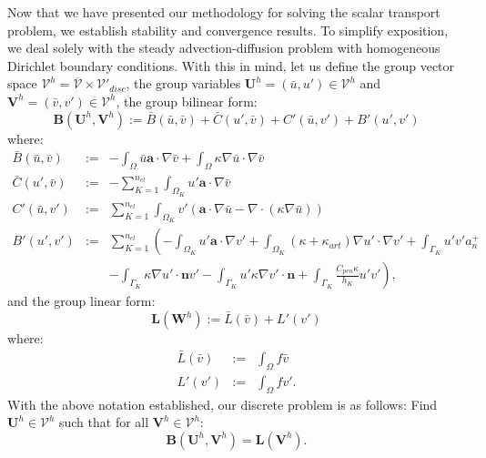 \documentclass[11pt]{article}
\begin{document}
\noindent Now that we have presented our methodology for solving the scalar transport problem, we establish stability and convergence results.  To simplify exposition, we deal solely with the steady advection-diffusion problem with homogeneous Dirichlet boundary conditions.  With this in mind, let us define the group vector space $\bm{\mathcal{V}}^h = \overline{\mathcal{V}} \times \mathcal{V}'_{disc}$, the group variables $\textbf{U}^h = \left( \bar{u}, u' \right) \in \bm{\mathcal{V}}^h$ and $\textbf{V}^h = \left( \bar{v}, v'\right) \in \bm{\mathcal{V}}^h$, the group bilinear form:
\begin{equation}
\mathbf{B}\left(\textbf{U}^h,\textbf{V}^h\right) := \bar{B}(\bar{u},\bar{v}) + \bar{C}(u',\bar{v}) + C'(\bar{u},v') + B'(u',v')
\end{equation}
where:
\begin{eqnarray}
\bar{B}(\bar{u},\bar{v}) & := & -\int_{\Omega} \bar{u} \bm{a} \cdot \nabla \bar{v} + \int_{\Omega} \kappa \nabla \bar{u} \cdot \nabla \bar{v} \nonumber \\
\bar{C}(u',\bar{v}) & := & -\sum_{K=1}^{n_{el}} \int_{\Omega_K} u' \bm{a} \cdot \nabla \bar{v} \nonumber \\
C'(\bar{u},v') & := & \sum_{K=1}^{n_{el}} \int_{\Omega_K} v' \left( \bm{a} \cdot \nabla \bar{u} - \nabla \cdot \left( \kappa \nabla \bar{u} \right) \right) \nonumber \\
B'(u',v') & := & \sum_{K=1}^{n_{el}} \left( -\int_{\Omega_K} u' \bm{a} \cdot \nabla v' + \int_{\Omega_K} \left( \kappa + \kappa_{art} \right) \nabla u' \cdot \nabla v' + \int_{\Gamma_K} u' v' a_n^+ \right. \nonumber \\
& & \left. - \int_{\Gamma_K} \kappa \nabla u' \cdot \bm{n} v' - \int_{\Gamma_K} u' \kappa \nabla v' \cdot \bm{n} + \int_{\Gamma_K} \frac{C_{pen} \kappa}{h_K} u' v' \right), \nonumber
\end{eqnarray}
and the group linear form:
\begin{equation}
\mathbf{L}\left(\textbf{W}^h\right) := \bar{L}(\bar{v}) + L'(v')
\end{equation}
where:
\begin{eqnarray}
\bar{L}(\bar{v}) & := & \int_{\Omega} f \bar{v} \nonumber \\
L'(v') & := & \int_{\Omega} f v' \nonumber.
\end{eqnarray}
With the above notation established, our discrete problem is as follows: Find $\textbf{U}^h \in \bm{\mathcal{V}}^h$ such that for all $\textbf{V}^h \in \bm{\mathcal{V}}^h$:
\begin{equation}
\mathbf{B}\left(\textbf{U}^h,\textbf{V}^h\right) = \mathbf{L}\left(\textbf{V}^h\right).
\end{equation}
\end{document}
